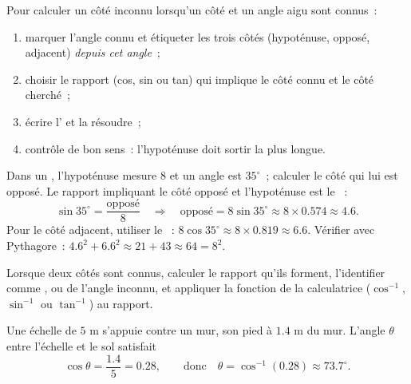 \begin{method}\label{met:g9:trig:side}
Pour calculer un côté inconnu lorsqu'un côté et un angle aigu sont
connus~:
\begin{enumerate}
  \item marquer l'angle connu et étiqueter les trois côtés (hypoténuse,
        opposé, adjacent) \emph{depuis cet angle}~;
  \item choisir le rapport (cos, sin ou tan) qui implique le côté connu
        et le côté cherché~;
  \item écrire l' et la résoudre~;
  \item contrôle de bon sens~: l'hypoténuse doit sortir la plus longue.
\end{enumerate}
\end{method}

\begin{example}\label{ex:g9:trig:side}
Dans un , l'hypoténuse mesure $8$ et un angle est
$35^\circ$~; calculer le côté qui lui est opposé. Le rapport impliquant
le côté opposé et l'hypoténuse est le ~:
\[
\sin 35^\circ = \frac{\text{opposé}}{8}
\quad\Longrightarrow\quad
\text{opposé} = 8 \sin 35^\circ \approx 8 \times 0.574 \approx 4.6 .
\]
Pour le côté adjacent, utiliser le ~:
$8\cos 35^\circ \approx 8 \times 0.819 \approx 6.6$. Vérifier avec
Pythagore~: $4.6^2 + 6.6^2 \approx 21 + 43 \approx 64 = 8^2$.
\end{example}

\begin{method}\label{met:g9:trig:angle}
Lorsque deux côtés sont connus, calculer le rapport qu'ils forment,
l'identifier comme ,  ou  de l'angle inconnu, et
appliquer la fonction  de la calculatrice ($\cos^{-1}$,
$\sin^{-1}$ ou $\tan^{-1}$) au rapport.
\end{method}

\begin{example}\label{ex:g9:trig:angle}
Une échelle de $5$ m s'appuie contre un mur, son pied à $1.4$ m du mur.
L'angle $\theta$ entre l'échelle et le sol satisfait
\[
\cos\theta = \frac{1.4}{5} = 0.28,
\qquad\text{donc}\quad
\theta = \cos^{-1}(0.28) \approx 73.7^\circ .
\]
\end{example}

